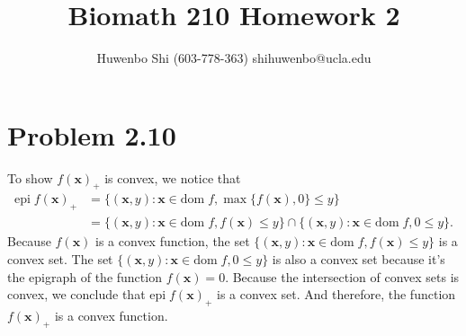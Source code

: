 \documentclass{scrartcl}
\begin{document}

\newcommand*{\TitleFont}{
      \usefont{\encodingdefault}{\rmdefault}{b}{n}
      \fontsize{16}{20}
      \selectfont}
\newcommand*{\AuthorFont}{
      \usefont{\encodingdefault}{\rmdefault}{r}{n}
      \fontsize{12}{20}
      \selectfont}
\title{\TitleFont Biomath 210 Homework 2}
\author{\AuthorFont Huwenbo Shi (603-778-363) shihuwenbo@ucla.edu}
\maketitle

\newcommand*{\argmin}{\operatornamewithlimits{argmin}\limits}
\newcommand{\tr}{\mathrm{tr}}
\newcommand{\dom}{\mathrm{dom}}
\newcommand{\E}{\mathrm{E}}
\newcommand{\epi}{\mathrm{epi}}
\def\mb#1{\mathbf{#1}}


\section*{Problem 2.10}

To show $f(\mb{x})_+$ is convex, we notice that
\begin{equation}
	\begin{split}
	\epi \; f(\mb{x})_+
		& = \{(\mb{x}, y) : \mb{x} \in \dom \;
	          f, \max\{f(\mb{x}), 0\} \le y \} \\
	    & = \{(\mb{x}, y) : \mb{x} \in \dom \; f, f(\mb{x}) \le y \} \cap
	        \{(\mb{x}, y) : \mb{x} \in \dom \; f, 0 \le y \} .
	\end{split}
\end{equation}
Because $f(\mb{x})$ is a convex function, the set
$\{(\mb{x}, y) : \mb{x} \in \dom \; f, f(\mb{x}) \le y \}$
is a convex set. The set $\{(\mb{x}, y) : \mb{x} \in \dom \; f, 0 \le y \}$
is also a convex set because it's the epigraph of the function $f(\mb{x}) = 0$.
Because the intersection of convex sets is convex, we conclude that
$\epi \; f(\mb{x})_+$ is a convex set. And therefore, the function
$f(\mb{x})_+$ is a convex function.
\end{document}
